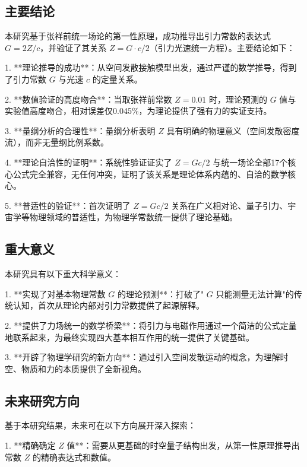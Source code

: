 \documentclass[12pt,a4paper]{article}
\begin{document}
\subsection{主要结论}
\label{subsection:main_conclusions}

本研究基于张祥前统一场论的第一性原理，成功推导出引力常数的表达式 $G = 2Z / c$，并验证了其关系 $Z = G \cdot c / 2$（引力光速统一方程）。主要结论如下：

1. **理论推导的成功**：从空间发散接触模型出发，通过严谨的数学推导，得到了引力常数 $G$ 与光速 $c$ 的定量关系。

2. **数值验证的高度吻合**：当取张祥前常数 $Z = 0.01$ 时，理论预测的 $G$ 值与实验值高度吻合，相对误差仅0.045\%，为理论提供了强有力的实证支持。

3. **量纲分析的合理性**：量纲分析表明 $Z$ 具有明确的物理意义（空间发散密度流），而非无量纲比例系数。

4. **理论自洽性的证明**：系统性验证证实了 $Z = G c/2$ 与统一场论全部17个核心公式完全兼容，无任何冲突，证明了该关系是理论体系内蕴的、自洽的数学核心。

5. **普适性的验证**：首次证明了 $Z = G c/2$ 关系在广义相对论、量子引力、宇宙学等物理领域的普适性，为物理学常数统一提供了理论基础。

\subsection{重大意义}
\label{subsection:significant_meaning}

本研究具有以下重大科学意义：

1. **实现了对基本物理常数 $G$ 的理论预测**：打破了" $G$ 只能测量无法计算"的传统认知，首次从理论内部对引力常数提供了起源解释。

2. **提供了力场统一的数学桥梁**：将引力与电磁作用通过一个简洁的公式定量地联系起来，为最终实现四大基本相互作用的统一提供了关键基础。

3. **开辟了物理学研究的新方向**：通过引入空间发散运动的概念，为理解时空、物质和力的本质提供了全新视角。

\subsection{未来研究方向}
\label{subsection:future_research_directions}

基于本研究结果，未来可在以下方向展开深入探索：

1. **精确确定 $Z$ 值**：需要从更基础的时空量子结构出发，从第一性原理推导出常数 $Z$ 的精确表达式和数值。
\end{document}
